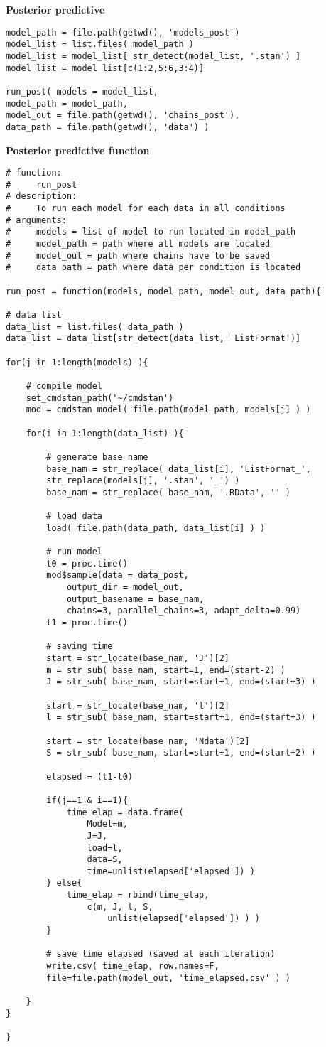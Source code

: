 \noindent \textbf{Posterior predictive}
%
\begin{lstlisting}
model_path = file.path(getwd(), 'models_post')
model_list = list.files( model_path )
model_list = model_list[ str_detect(model_list, '.stan') ]
model_list = model_list[c(1:2,5:6,3:4)]

run_post( models = model_list,
model_path = model_path,
model_out = file.path(getwd(), 'chains_post'),
data_path = file.path(getwd(), 'data') )
\end{lstlisting}


\noindent \textbf{Posterior predictive function}
%
\begin{lstlisting}
# function:
#     run_post
# description:  
#     To run each model for each data in all conditions
# arguments:
#     models = list of model to run located in model_path
#     model_path = path where all models are located
#     model_out = path where chains have to be saved
#     data_path = path where data per condition is located

run_post = function(models, model_path, model_out, data_path){
	
# data list
data_list = list.files( data_path )
data_list = data_list[str_detect(data_list, 'ListFormat')]
	
for(j in 1:length(models) ){
		
	# compile model
	set_cmdstan_path('~/cmdstan')
	mod = cmdstan_model( file.path(model_path, models[j] ) )
		
	for(i in 1:length(data_list) ){
			
		# generate base name
		base_nam = str_replace( data_list[i], 'ListFormat_', 
		str_replace(models[j], '.stan', '_') )
		base_nam = str_replace( base_nam, '.RData', '' )
			
		# load data
		load( file.path(data_path, data_list[i] ) )
			
		# run model
		t0 = proc.time()
		mod$sample(data = data_post, 
			output_dir = model_out, 
			output_basename = base_nam,
			chains=3, parallel_chains=3, adapt_delta=0.99)
		t1 = proc.time()
			
		# saving time
		start = str_locate(base_nam, 'J')[2]
		m = str_sub( base_nam, start=1, end=(start-2) )
		J = str_sub( base_nam, start=start+1, end=(start+3) )
			
		start = str_locate(base_nam, 'l')[2] 
		l = str_sub( base_nam, start=start+1, end=(start+3) )
		
		start = str_locate(base_nam, 'Ndata')[2]
		S = str_sub( base_nam, start=start+1, end=(start+2) )
		
		elapsed = (t1-t0)
			
		if(j==1 & i==1){
			time_elap = data.frame(
				Model=m, 
				J=J, 
				load=l, 
				data=S, 
				time=unlist(elapsed['elapsed']) )
		} else{
			time_elap = rbind(time_elap, 
				c(m, J, l, S, 
					unlist(elapsed['elapsed']) ) )
		}
			
		# save time elapsed (saved at each iteration)
		write.csv( time_elap, row.names=F, 
		file=file.path(model_out, 'time_elapsed.csv' ) )
			
	}
}

}
\end{lstlisting}




